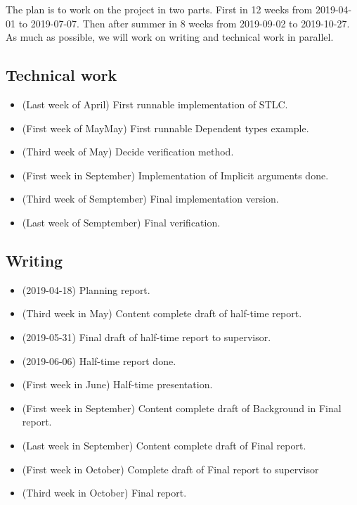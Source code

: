 \documentclass[parskip=half]{scrartcl}
\begin{document}
The plan is to work on the project in two parts. First in 12 weeks from
2019-04-01 to 2019-07-07. Then after summer in 8 weeks from 2019-09-02 to
2019-10-27. As much as possible, we will work on writing and technical work in
parallel.

\subsection{Technical work}
\begin{itemize}
  \item (Last week of April) First runnable implementation of STLC.
  \item (First week of MayMay) First runnable Dependent types example.
  \item (Third week of May) Decide verification method.
  \item (First week in September) Implementation of Implicit arguments done.
  \item (Third week of Semptember) Final implementation version.
  \item (Last week of Semptember) Final verification.
\end{itemize}

\subsection{Writing}
\begin{itemize}
  \item (2019-04-18) Planning report.
  \item (Third week in May) Content complete draft of half-time report.
  \item (2019-05-31) Final draft of half-time report to supervisor.
  \item (2019-06-06) Half-time report done.
  \item (First week in June) Half-time presentation.
  \item (First week in September) Content complete draft of Background in Final
    report.
  \item (Last week in September) Content complete draft of Final report.
  \item (First week in October) Complete draft of Final report to supervisor
  \item (Third week in October) Final report.
\end{itemize}
\end{document}
